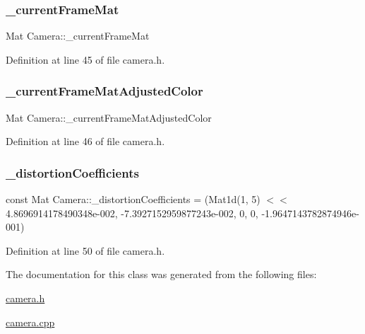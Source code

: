 \subsubsection{\texorpdfstring{\_currentFrameMat}{\_currentFrameMat}}
{\footnotesize\ttfamily Mat Camera\+::\+\_\+current\+Frame\+Mat\hspace{0.3cm}{\ttfamily [private]}}



Definition at line 45 of file camera.\+h.

\mbox{\label{classCamera_aeeeed5ac66a515e73cb315df765834ef}} 
\subsubsection{\texorpdfstring{\_currentFrameMatAdjustedColor}{\_currentFrameMatAdjustedColor}}
{\footnotesize\ttfamily Mat Camera\+::\+\_\+current\+Frame\+Mat\+Adjusted\+Color\hspace{0.3cm}{\ttfamily [private]}}



Definition at line 46 of file camera.\+h.

\mbox{\label{classCamera_a1e62bd10af4149eab0ca79e1c39a11ea}} 
\subsubsection{\texorpdfstring{\_distortionCoefficients}{\_distortionCoefficients}}
{\footnotesize\ttfamily const Mat Camera\+::\+\_\+distortion\+Coefficients = (Mat1d(1, 5) $<$$<$ 4.\+8696914178490348e-\/002, -\/7.\+3927152959877243e-\/002, 0, 0, -\/1.\+9647143782874946e-\/001)\hspace{0.3cm}{\ttfamily [private]}}



Definition at line 50 of file camera.\+h.



The documentation for this class was generated from the following files\+:\begin{DoxyCompactItemize}
\item 
\mbox{\hyperlink{camera_8h}{camera.\+h}}\item 
\mbox{\hyperlink{camera_8cpp}{camera.\+cpp}}\end{DoxyCompactItemize}
